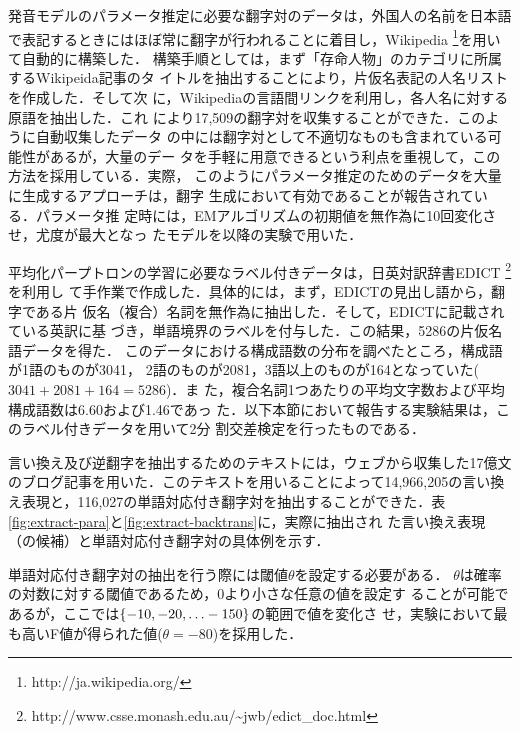 \documentclass[japanese]{jnlp_1.4}
\begin{document}
発音モデルのパラメータ推定に必要な翻字対のデータは，外国人の名前を日本語
で表記するときにはほぼ常に翻字が行われることに着目し，Wikipedia
\footnote{http://ja.wikipedia.org/}を用いて自動的に構築した．
構築手順としては，まず「存命人物」のカテゴリに所属するWikipeida記事のタ
イトルを抽出することにより，片仮名表記の人名リストを作成した．そして次
に，Wikipediaの言語間リンクを利用し，各人名に対する原語を抽出した．これ
により17,509の翻字対を収集することができた．このように自動収集したデータ
の中には翻字対として不適切なものも含まれている可能性があるが，大量のデー
タを手軽に用意できるという利点を重視して，この方法を採用している．実際，
このようにパラメータ推定のためのデータを大量に生成するアプローチは，翻字
生成において有効であることが報告されている\cite{Cherry09}．パラメータ推
定時には，EMアルゴリズムの初期値を無作為に10回変化させ，尤度が最大となっ
たモデルを以降の実験で用いた．

\begin{table}[t]
    \label{fig:extract-backtrans}

\end{table}

平均化パープトロンの学習に必要なラベル付きデータは，日英対訳辞書EDICT
\footnote{http://www.csse.monash.edu.au/\~{}jwb/edict\_doc.html}を利用し
て手作業で作成した．具体的には，まず，EDICTの見出し語から，翻字である片
仮名（複合）名詞を無作為に抽出した．そして，EDICTに記載されている英訳に基
づき，単語境界のラベルを付与した．この結果，5286の片仮名語データを得た．
このデータにおける構成語数の分布を調べたところ，構成語が1語のものが3041，
2語のものが2081，3語以上のものが164となっていた($3041+2081+164=5286$)．ま
た，複合名詞1つあたりの平均文字数および平均構成語数は6.60および1.46であっ
た．以下本節において報告する実験結果は，このラベル付きデータを用いて2分
割交差検定を行ったものである．

言い換え及び逆翻字を抽出するためのテキストには，ウェブから収集した17億文
のブログ記事を用いた．このテキストを用いることによって14,966,205の言い換
え表現と，116,027の単語対応付き翻字対を抽出することができた．表
\ref{fig:extract-para}と\ref{fig:extract-backtrans}に，実際に抽出され
た言い換え表現（の候補）と単語対応付き翻字対の具体例を示す．

単語対応付き翻字対の抽出を行う際には閾値$\theta$を設定する必要がある．
$\theta$は確率の対数に対する閾値であるため，0より小さな任意の値を設定す
ることが可能であるが，ここでは$\{-10,-20,\dots\linebreak
-150\}$の範囲で値を変化さ
せ，実験において最も高いF値が得られた値($\theta=-80$)を採用した．
\end{document}
